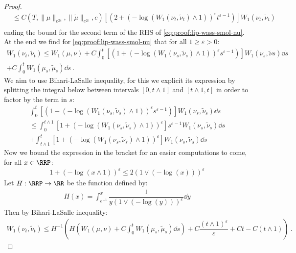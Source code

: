 \begin{proof}
\begin{align*}
        &\leq C(T,\|\mu\|_{e^{2c}},\|\tilde{\mu}\|_{e^{2c}},c)\left[\left( 2 + \left(-\log(W_1(\nu_t,\tilde{\nu}_t)\wedge 1)\right)^\varepsilon t^{\varepsilon -1}\right) \right]W_1(\nu_t,\tilde{\nu}_t) \\
    \end{align*}
    ending the bound for the second term of the RHS of \eqref{eq:proof:lip-wass-smol-nu}. At the end we find for \eqref{eq:proof:lip-wass-smol-nu} that for all $1 \geq \varepsilon > 0$:
    \begin{multline*}
        W_1(\nu_t, \tilde{\nu}_t) \leq W_1(\mu, \nu) + C\int_0^t \left[\left( 1 + \left(-\log(W_1(\nu_s,\tilde{\nu}_s)\wedge 1)\right)^\varepsilon s^{\varepsilon -1}\right) \right]W_1(\nu_s,\tilde{\nu}s)\dd s\\  + C\int_0^t W_1(\mu_s,\tilde{\mu}_s) \dd s\ .
     \end{multline*}
     We aim to use Bihari-LaSalle inequality, for this we explicit its expression by splitting the integral below between intervals $[0,t \wedge 1]$ and $[t \wedge 1,t]$ in order to factor by the term in $s$:
     \begin{multline*}
         \int_0^t \left[\left( 1 + \left(-\log(W_1(\nu_s,\tilde{\nu}_s)\wedge 1)\right)^\varepsilon s^{\varepsilon -1}\right) \right]W_1(\nu_s,\tilde{\nu}_s)\dd s\\
         \leq  \int_0^{t \wedge 1} \left[ 1 + \left(-\log(W_1(\nu_s,\tilde{\nu}_s)\wedge 1)\right)^\varepsilon\right] s^{\varepsilon -1}W_1(\nu_s,\tilde{\nu}_s)\dd s\\
         + \int_{t \wedge 1}^t  \left[ 1 + \left(-\log(W_1(\nu_s,\tilde{\nu}_s)\wedge 1)\right)^\varepsilon\right] W_1(\nu_s,\tilde{\nu}_s)\dd s
     \end{multline*}
     Now we bound the expression in the bracket for an easier computations to come, for all $x \in \RRP$:
     \begin{align*}
         1 + \left(-\log(x\wedge 1)\right)^\varepsilon  \leq 2 (1\vee(-\log(x)))^\varepsilon
     \end{align*}
     Let $H : \RRP \to \RR$ be the function defined by:
     \begin{align*}
         H(x) = \int_{e^{-1}}^x \dfrac{1}{y(1\vee(-\log(y)))^\varepsilon}\dd y
     \end{align*}
     Then by Bihari-LaSalle inequality:
     \begin{align*}
         W_1(\nu_t, \tilde{\nu}_t) \leq H^{-1}\left( H\left(W_1(\mu, \nu) + C\int_0^t W_1(\mu_s,\tilde{\mu}_s) \dd s\right) + C\dfrac{(t\wedge 1)^\varepsilon}{\varepsilon} + Ct-C(t\wedge 1)\right)\ .

\end{align*}
\end{proof}
